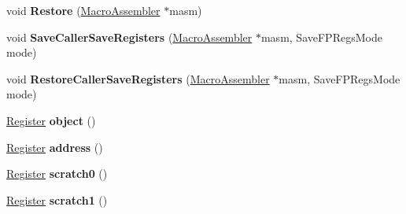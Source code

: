 \begin{DoxyCompactItemize}
\item 
void {\bfseries Restore} (\hyperlink{classv8_1_1internal_1_1_macro_assembler}{Macro\+Assembler} $\ast$masm)\hypertarget{classv8_1_1internal_1_1_record_write_stub_1_1_register_allocation_a391db63ae1afc97c528cf3b5e92b9c2a}{}\label{classv8_1_1internal_1_1_record_write_stub_1_1_register_allocation_a391db63ae1afc97c528cf3b5e92b9c2a}

\item 
void {\bfseries Save\+Caller\+Save\+Registers} (\hyperlink{classv8_1_1internal_1_1_macro_assembler}{Macro\+Assembler} $\ast$masm, Save\+F\+P\+Regs\+Mode mode)\hypertarget{classv8_1_1internal_1_1_record_write_stub_1_1_register_allocation_a676d8a1bb19a5746cfc613e7374253e0}{}\label{classv8_1_1internal_1_1_record_write_stub_1_1_register_allocation_a676d8a1bb19a5746cfc613e7374253e0}

\item 
void {\bfseries Restore\+Caller\+Save\+Registers} (\hyperlink{classv8_1_1internal_1_1_macro_assembler}{Macro\+Assembler} $\ast$masm, Save\+F\+P\+Regs\+Mode mode)\hypertarget{classv8_1_1internal_1_1_record_write_stub_1_1_register_allocation_ab0958eb63ba22b285852dcc0cc87c285}{}\label{classv8_1_1internal_1_1_record_write_stub_1_1_register_allocation_ab0958eb63ba22b285852dcc0cc87c285}

\item 
\hyperlink{structv8_1_1internal_1_1_register}{Register} {\bfseries object} ()\hypertarget{classv8_1_1internal_1_1_record_write_stub_1_1_register_allocation_ae02efad51bfcbf6207b6bd04c1331e06}{}\label{classv8_1_1internal_1_1_record_write_stub_1_1_register_allocation_ae02efad51bfcbf6207b6bd04c1331e06}

\item 
\hyperlink{structv8_1_1internal_1_1_register}{Register} {\bfseries address} ()\hypertarget{classv8_1_1internal_1_1_record_write_stub_1_1_register_allocation_a7b0d92fe5d7ba3d4339a055369bc1750}{}\label{classv8_1_1internal_1_1_record_write_stub_1_1_register_allocation_a7b0d92fe5d7ba3d4339a055369bc1750}

\item 
\hyperlink{structv8_1_1internal_1_1_register}{Register} {\bfseries scratch0} ()\hypertarget{classv8_1_1internal_1_1_record_write_stub_1_1_register_allocation_ae60e0fd70f8010f33818c9a5a30d0057}{}\label{classv8_1_1internal_1_1_record_write_stub_1_1_register_allocation_ae60e0fd70f8010f33818c9a5a30d0057}

\item 
\hyperlink{structv8_1_1internal_1_1_register}{Register} {\bfseries scratch1} ()\hypertarget{classv8_1_1internal_1_1_record_write_stub_1_1_register_allocation_a5834c8a35762e9a5346835d345b69bd2}{}\label{classv8_1_1internal_1_1_record_write_stub_1_1_register_allocation_a5834c8a35762e9a5346835d345b69bd2}


\end{DoxyCompactItemize}
